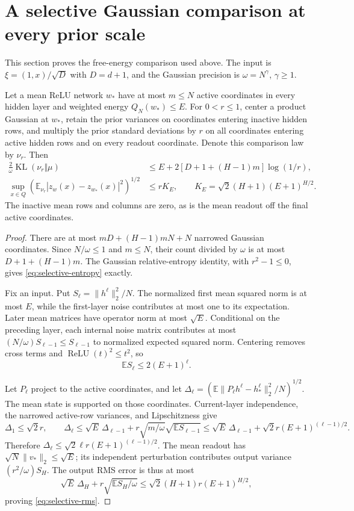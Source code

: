 \section{A selective Gaussian comparison at every prior scale}
\label{sec:selective-standalone}
This section proves the free-energy comparison used above. The input is $\xi=(1,x)/\sqrt D$ with $D=d+1$, and the Gaussian precision is $\omega=N^\gamma$, $\gamma\ge1$.

\begin{lemma}
Let a mean ReLU network $w_*$ have at most $m\le N$ active coordinates in every hidden layer and weighted energy $Q_N(w_*)\le E$. For $0<r\le1$, center a product Gaussian at $w_*$, retain the prior variances on coordinates entering inactive hidden rows, and multiply the prior standard deviations by $r$ on all coordinates entering active hidden rows and on every readout coordinate. Denote this comparison law by $\nu_r$. Then
\begin{align}
 \frac2\omega\operatorname{KL}(\nu_r\Vert\mu)
 &\le E+2[D+1+(H-1)m]\log(1/r),\label{eq:selective-entropy}\\
 \sup_{x\in Q}\left(\mathbb E_{\nu_r}|z_w(x)-z_{w_*}(x)|^2\right)^{1/2}
 &\le rK_E,\qquad K_E=\sqrt2(H+1)(E+1)^{H/2}.
 \label{eq:selective-rms}
\end{align}
The inactive mean rows and columns are zero, as is the mean readout off the final active coordinates.
\end{lemma}
\begin{proof}
There are at most $mD+(H-1)mN+N$ narrowed Gaussian coordinates. Since $N/\omega\le1$ and $m\le N$, their count divided by $\omega$ is at most $D+1+(H-1)m$. The Gaussian relative-entropy identity, with $r^2-1\le0$, gives \eqref{eq:selective-entropy} exactly.

Fix an input. Put $S_\ell=\|h^\ell\|_2^2/N$. The normalized first mean squared norm is at most $E$, while the first-layer noise contributes at most one to its expectation. Later mean matrices have operator norm at most $\sqrt E$. Conditional on the preceding layer, each internal noise matrix contributes at most $(N/\omega)S_{\ell-1}\le S_{\ell-1}$ to normalized expected squared norm. Centering removes cross terms and $\operatorname{ReLU}(t)^2\le t^2$, so
\[
 \mathbb E S_\ell\le2(E+1)^\ell.
\]

Let $P_\ell$ project to the active coordinates, and let
$\Delta_\ell=(\mathbb E\|P_\ell h^\ell-h_*^\ell\|_2^2/N)^{1/2}$.
The mean state is supported on those coordinates. Current-layer independence, the narrowed active-row variances, and Lipschitzness give
\[
 \Delta_1\le\sqrt2r,\qquad
 \Delta_\ell\le\sqrt E\,\Delta_{\ell-1}
       +r\sqrt{m/\omega}\sqrt{\mathbb E S_{\ell-1}}
 \le\sqrt E\,\Delta_{\ell-1}
       +\sqrt2r(E+1)^{(\ell-1)/2}.
\]
Therefore $\Delta_\ell\le\sqrt2\ell r(E+1)^{(\ell-1)/2}$. The mean readout has $\sqrt N\|v_*\|_2\le\sqrt E$; its independent perturbation contributes output variance $(r^2/\omega)S_H$. The output RMS error is thus at most
\[
 \sqrt E\,\Delta_H+r\sqrt{\mathbb E S_H/\omega}
 \le\sqrt2(H+1)r(E+1)^{H/2},
\]
proving \eqref{eq:selective-rms}.
\end{proof}


